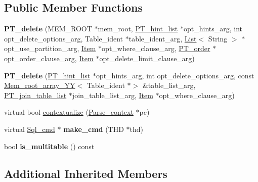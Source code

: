 \subsection*{Public Member Functions}
\begin{DoxyCompactItemize}
\item 
\mbox{\label{classPT__delete_a46b3b3d7b099d364e53ef83cf5d71103}} 
{\bfseries P\+T\+\_\+delete} (M\+E\+M\+\_\+\+R\+O\+OT $\ast$mem\+\_\+root, \mbox{\hyperlink{classPT__hint__list}{P\+T\+\_\+hint\+\_\+list}} $\ast$opt\+\_\+hints\+\_\+arg, int opt\+\_\+delete\+\_\+options\+\_\+arg, Table\+\_\+ident $\ast$table\+\_\+ident\+\_\+arg, \mbox{\hyperlink{classList}{List}}$<$ String $>$ $\ast$opt\+\_\+use\+\_\+partition\+\_\+arg, \mbox{\hyperlink{classItem}{Item}} $\ast$opt\+\_\+where\+\_\+clause\+\_\+arg, \mbox{\hyperlink{classPT__order}{P\+T\+\_\+order}} $\ast$opt\+\_\+order\+\_\+clause\+\_\+arg, \mbox{\hyperlink{classItem}{Item}} $\ast$opt\+\_\+delete\+\_\+limit\+\_\+clause\+\_\+arg)
\item 
\mbox{\label{classPT__delete_a5d7d660b025a3982c36e1261116b4880}} 
{\bfseries P\+T\+\_\+delete} (\mbox{\hyperlink{classPT__hint__list}{P\+T\+\_\+hint\+\_\+list}} $\ast$opt\+\_\+hints\+\_\+arg, int opt\+\_\+delete\+\_\+options\+\_\+arg, const \mbox{\hyperlink{classMem__root__array__YY}{Mem\+\_\+root\+\_\+array\+\_\+\+YY}}$<$ Table\+\_\+ident $\ast$$>$ \&table\+\_\+list\+\_\+arg, \mbox{\hyperlink{classPT__join__table__list}{P\+T\+\_\+join\+\_\+table\+\_\+list}} $\ast$join\+\_\+table\+\_\+list\+\_\+arg, \mbox{\hyperlink{classItem}{Item}} $\ast$opt\+\_\+where\+\_\+clause\+\_\+arg)
\item 
virtual bool \mbox{\hyperlink{classPT__delete_af4282b73da9ec50c66c814422e7deb06}{contextualize}} (\mbox{\hyperlink{structParse__context}{Parse\+\_\+context}} $\ast$pc)
\item 
\mbox{\label{classPT__delete_a49c0fb474e41c769aa552a3133445c16}} 
virtual \mbox{\hyperlink{classSql__cmd}{Sql\+\_\+cmd}} $\ast$ {\bfseries make\+\_\+cmd} (T\+HD $\ast$thd)
\item 
\mbox{\label{classPT__delete_a1f8f60bf2381e088a88b993441730997}} 
bool {\bfseries is\+\_\+multitable} () const
\end{DoxyCompactItemize}
\subsection*{Additional Inherited Members}


